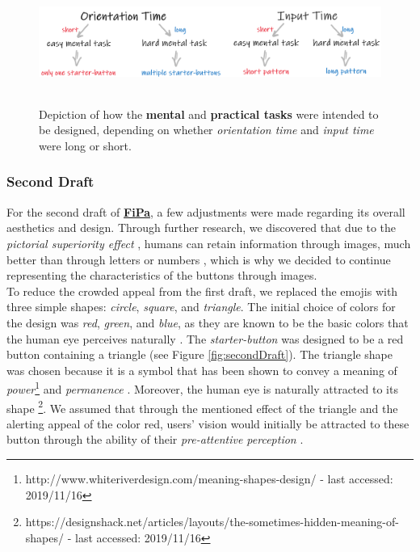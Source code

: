 \begin{figure}[t!]
\centering
\includegraphics[width=12cm, height=4cm]{Chapters/graphics/OriInput.PNG}
\caption{Depiction of how the \textbf{mental} and \textbf{practical tasks} were intended to be designed, depending on whether \textit{orientation time} and \textit{input time} were long or short.}
\label{fig:orientation_input}
\end{figure}


\subsubsection{Second Draft} \label{4.2.2.3}

For the second draft of \underline{\textbf{FiPa}}, a few adjustments were made  regarding its overall aesthetics and  design. Through further research, we discovered that due to the \textit{pictorial superiority effect} \cite{pictorial}, humans can retain information through images, much better than through letters or numbers \cite{pictorial, 2014}, which is why we decided to continue representing the characteristics of the buttons through images.\\
To reduce the crowded appeal from the first draft, we replaced the emojis with three simple shapes: \textit{circle}, \textit{square}, and \textit{triangle}. The initial choice of colors for the design was \textit{red}, \textit{green}, and \textit{blue}, as they are known to be the basic colors that the human eye perceives naturally \cite{Butz2014}. The \textit{starter-button} was designed to be a red button containing a triangle (see Figure \ref{fig:secondDraft}). The triangle shape was chosen because it is a symbol that has been shown to convey a meaning of \textit{power}\footnote{http://www.whiteriverdesign.com/meaning-shapes-design/ - last accessed: 2019/11/16} and \textit{permanence} \cite{Frutiger1998}.  Moreover, the human eye is naturally attracted to its shape \footnote{https://designshack.net/articles/layouts/the-sometimes-hidden-meaning-of-shapes/ - last accessed: 2019/11/16}. We assumed that through the mentioned effect of the triangle and the alerting appeal of the color red, users' vision would initially be attracted to these button through the ability of their \textit{pre-attentive perception} \cite{Butz2014}. \\


